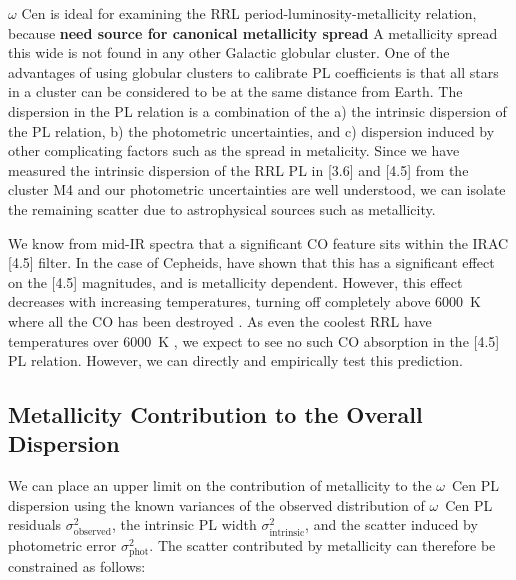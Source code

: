 \documentclass[a4paper,fleqn,usenatbib]{mnras}
\begin{document}
$\omega$ Cen is ideal for examining the RRL period-luminosity-metallicity relation, because {\bf need source for canonical metallicity spread}
A metallicity spread this wide is not found in any other Galactic globular cluster. One of the advantages of using globular clusters to calibrate PL coefficients is that all stars in a cluster can be considered to be at the same distance from Earth. The dispersion in the PL relation is a combination of the a) the intrinsic dispersion of the PL relation, b) the photometric uncertainties, and c) dispersion induced by other complicating factors such as the spread in metalicity. Since we have measured the intrinsic dispersion of the RRL PL in [3.6] and [4.5] from the cluster M4 \citep{2015ApJ...808...11N} and our photometric uncertainties are well understood, we can isolate the remaining scatter due to astrophysical sources such as metallicity. %

We know from mid-IR spectra that a significant CO feature sits within the IRAC [4.5] filter. In the case of Cepheids, \citet{2012ApJ...759..146M} have shown that this has a significant effect on the [4.5] magnitudes, and is metallicity dependent. However, this effect decreases with increasing temperatures, turning off completely above 6000~K where all the CO has been destroyed \citep{2012ApJ...759..146M}. As even the coolest RRL have temperatures over 6000~K \citep{1971PASP...83..697I}, we expect to see no such CO absorption in the [4.5] PL relation. However, we can directly and empirically test this prediction. %

\subsection{Metallicity Contribution to the Overall Dispersion}
\label{sec:dispersions}

We can place an upper limit on the contribution of metallicity to the $\omega$~Cen PL dispersion using the known variances of the observed distribution of $\omega$~Cen PL residuals $\sigma_{\text{observed}}^2$, the intrinsic PL width $\sigma_{\text{intrinsic}}^2$, and the scatter induced by photometric error $\sigma_{\text{phot}}^2$. The scatter contributed by metallicity can therefore be constrained as follows:
\end{document}
